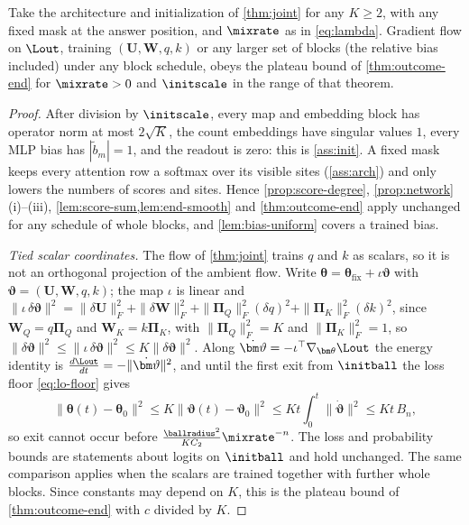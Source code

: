 \begin{corollary}
\label{cor:joint-outcome}
Take the architecture and initialization of \cref{thm:joint} for any $K\ge2$, with any fixed mask at the answer position, and $\mixrate$ as in
\cref{eq:lambda}. Gradient flow on $\Lout$, training $(\mathbf U,\mathbf W,q,k)$ or any larger set of blocks (the relative bias included) under any block
schedule, obeys the plateau bound of \cref{thm:outcome-end} for $\mixrate>0$ and $\initscale$ in the range of that theorem.
\end{corollary}

\begin{proof}
After division by $\initscale$, every map and embedding block has operator norm at most $2\sqrt K$, the count embeddings have singular values
$1$, every MLP bias has $|\tilde b_m|=1$, and the readout is zero: this is \cref{ass:init}. A fixed mask keeps every attention row a softmax over
its visible sites (\cref{ass:arch}) and only lowers the numbers of scores and sites. Hence \cref{prop:score-degree}, \cref{prop:network}(i)--(iii),
\cref{lem:score-sum,lem:end-smooth} and \cref{thm:outcome-end} apply unchanged for any schedule of whole blocks, and \cref{lem:bias-uniform} covers a trained bias.

\emph{Tied scalar coordinates.} The flow of \cref{thm:joint} trains $q$ and $k$ as scalars, so it is not an orthogonal projection of
the ambient flow. Write $\bm\theta=\bm\theta_{\mathrm{fix}}+\iota\bm\vartheta$ with $\bm\vartheta=(\mathbf U,\mathbf W,q,k)$; the map $\iota$ is linear and
$\|\iota\,\delta\bm\vartheta\|^2=\|\delta\mathbf U\|_F^2+\|\delta\mathbf W\|_F^2+\|\bm\Pi_Q\|_F^2(\delta q)^2+\|\bm\Pi_K\|_F^2(\delta k)^2$,
since $\mathbf W_Q=q\bm\Pi_Q$ and $\mathbf W_K=k\bm\Pi_K$, with $\|\bm\Pi_Q\|_F^2=K$ and $\|\bm\Pi_K\|_F^2=1$, so $\|\delta\bm\vartheta\|^2\le\|\iota\,\delta\bm\vartheta\|^2\le K\|\delta\bm\vartheta\|^2$. Along
$\dot{\bm\vartheta}=-\iota^\top\nabla_{\bm\theta}\Lout$ the energy identity is $\frac{d\Lout}{dt}=-\|\dot{\bm\vartheta}\|^2$, and until the first exit from
$\initball$ the loss floor \cref{eq:lo-floor} gives
\[
 \|\bm\theta(t)-\bm\theta_0\|^2\le K\|\bm\vartheta(t)-\bm\vartheta_0\|^2\le Kt\int_0^t\|\dot{\bm\vartheta}\|^2\le Kt\,B_n ,
\]
so exit cannot occur before $\frac{\ballradius^2}{KC_2}\mixrate^{-n}$. The loss and probability bounds are statements about logits on $\initball$ and
hold unchanged. The same comparison applies when the scalars are trained together with further whole blocks. Since constants may depend
on $K$, this is the plateau bound of \cref{thm:outcome-end} with $c$ divided by $K$.
\end{proof}

